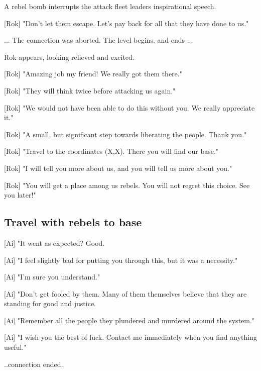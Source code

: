\documentclass[a4paper,12pt]{article}
\begin{document}
A rebel bomb interrupts the attack fleet leaders inspirational speech.

[Rok] "Don't let them escape. Let's pay back for all that they have done to us."

... The connection was aborted. The level begins, and ends ...

Rok appears, looking relieved and excited.

[Rok] "Amazing job my friend! We really got them there." 

[Rok] "They will think twice before attacking us again."

[Rok] "We would not have been able to do this without you. We really appreciate it."

[Rok] "A small, but significant step towards liberating the people. Thank you."

[Rok] "Travel to the coordinates (X,X). There you will find our base." 

[Rok] "I will tell you more about us, and you will tell us more about you." 

[Rok] "You will get a place among us rebels. You will not regret this choice. See you later!"

\subsection{Travel with rebels to base}

[Ai] "It went as expected? Good. 

[Ai] "I feel slightly bad for putting you through this, but it was a necessity." 

[Ai] "I'm sure you understand."

[Ai] "Don't get fooled by them. Many of them themselves believe that they
are standing for good and justice.

[Ai] "Remember all the people they plundered and murdered around the system."

[Ai] "I wish you the best of luck. Contact me immediately when you find anything useful."

..connection ended..
\end{document}
